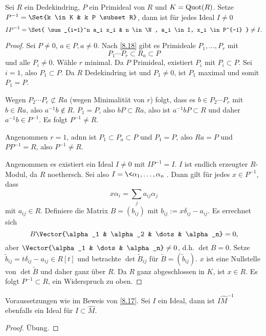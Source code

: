 \begin{lem} \label{8.19}
	Sei $R$ ein Dedekindring, $P$ ein Primideal von $R$ und $K = \operatorname{Quot}(R)$.
	Setze $P^{-1} = \Set{k \in K & k P \subset R}$, dann ist für jedes Ideal $I \neq 0$
	\[
		I P^{-1} =
		\Set{ \sum_{i=1}^n a_i x_i & n \in \N, a_i \in I, x_i \in P^{-1} }
		\neq I.
	\]
	\begin{proof}
		Sei \oBdA $P \neq 0$, $a \in P, a \neq 0$.
		Nach \ref{8.18} gibt es Primideale $P_1, \dotsc, P_r$ mit
		\[
			P_1 \dotsb P_r \subset R_a \subset P
		\]
		und alle $P_i \neq 0$.
		Wähle $r$ minimal.
		Da $P$ Primideal, existiert $P_i$ mit $P_i \subset P$.
		Sei \oBdA $i = 1$, also $P_1 \subset P$.
		Da $R$ Dedekindring ist und $P_1 \neq 0$, ist $P_1$ maximal und somit $P_1 = P$.

		Wegen $P_2 \dotsb P_r \not\subset Ra$ (wegen Minimalität von $r$) folgt, dass es $b \in P_2 \dotsb P_r$ mit $b \in Ra$, also $a^{-1}b \not\in R$.
		$P_1 = P$, also $b P \subset Ra$, also ist $a^{-1}b P \subset R$ und daher $a^{-1} b \in P^{-1}$.
		Es folgt $P^{-1} \neq R$.

		Angenommen $r = 1$, adnn ist $P_1 \subset P_a \subset P$ und $P_1 = P$, also $Ra = P$ und $PP^{-1} = R$, also $P^{-1} \neq R$.

		Angenommen es existiert ein Ideal $I \neq 0$ mit $I P^{-1} = I$.
		$I$ ist endlich erzeugter $R$-Modul, da $R$ noethersch.
		Sei also $I = \<\alpha_1, \dotsc, \alpha_n\>$.
		Dann gilt für jedes $x \in P^{-1}$, dass
		\[
			x \alpha_i = \sum_{j} a_{ij} \alpha_j
		\]
		mit $a_{ij} \in R$.
		Definiere die Matrix $B = (b_{ij})$ mit $b_{ij} := x \delta_{ij} - a_{ij}$.
		Es errechnet sich
		\[
			B \Vector{\alpha_1 & \alpha_2 & \dots & \alpha_n} = 0,
		\]
		aber $\Vector{\alpha_1 & \dots & \alpha_n} \neq 0$, d.h. $\det B = 0$.
		Setze $\tilde b_{ij} = t \delta_{ij} - a_{ij} \in R[t]$ und betrachte $\det \tilde B_{ij}$ für $\tilde B = (\tilde b_{ij})$.
		$x$ ist eine Nullstelle von $\det \tilde B$ und daher ganz über $R$.
		Da $R$ ganz abgeschlossen in $K$, ist $x \in R$.
		Es folgt $P^{-1} \subset R$, ein Widerspruch zu oben.
	\end{proof}
\end{lem}

\begin{lem} \label{8.20}
	Voraussetzungen wie im Beweis von \ref{8.17}.
	Sei $I$ ein Ideal, dann ist $I \hat M^{-1}$ ebenfalls ein Ideal für $I \subset \hat M$.
	\begin{proof}
		Übung.
	\end{proof}
\end{lem}
